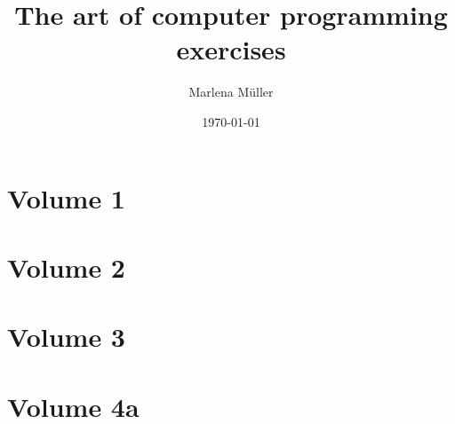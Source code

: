 \documentclass[a4paper, 12pt]{scrbook}
\begin{document}
\title{\glqq The art of computer programming\grqq{}  exercises}
\author{Marlena Müller}
\date{\today}

\maketitle
\tableofcontents
\part{Volume 1}



\part{Volume 2}


\part{Volume 3}


\part{Volume 4a}

\end{document}
